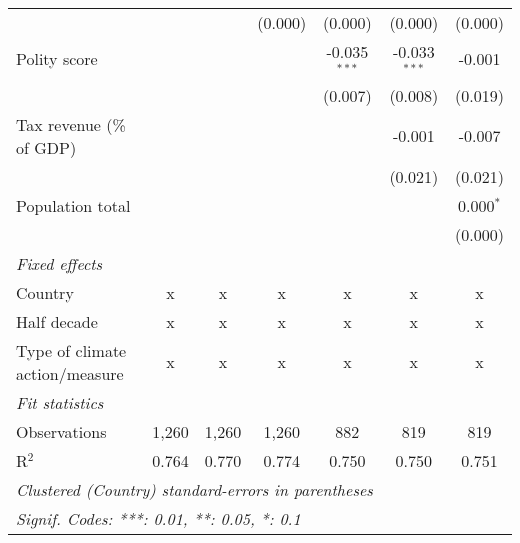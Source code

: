 \begin{tabular}{lcccccc}
                                                                                       &                &               & (0.000)       & (0.000)        & (0.000)        & (0.000)\\   
   Polity score                                                                        &                &               &               & -0.035$^{***}$ & -0.033$^{***}$ & -0.001\\   
                                                                                       &                &               &               & (0.007)        & (0.008)        & (0.019)\\   
   Tax revenue (\% of GDP)                                                             &                &               &               &                & -0.001         & -0.007\\   
                                                                                       &                &               &               &                & (0.021)        & (0.021)\\   
   Population total                                                                    &                &               &               &                &                & 0.000$^{*}$\\   
                                                                                       &                &               &               &                &                & (0.000)\\   
   \emph{Fixed effects}\\
   Country                                                                             & x              & x             & x             & x              & x              & x\\  
   Half decade                                                                         & x              & x             & x             & x              & x              & x\\  
   Type of climate action/measure                                                      & x              & x             & x             & x              & x              & x\\  
   \midrule \emph{Fit statistics}\\
   Observations                                                                        & 1,260          & 1,260         & 1,260         & 882            & 819            & 819\\  
   R$^2$                                                                               & 0.764          & 0.770         & 0.774         & 0.750          & 0.750          & 0.751\\  
   \midrule
   \multicolumn{7}{l}{\emph{Clustered (Country) standard-errors in parentheses}}\\
   \multicolumn{7}{l}{\emph{Signif. Codes: ***: 0.01, **: 0.05, *: 0.1}}\\
\end{tabular}
\par\endgroup


